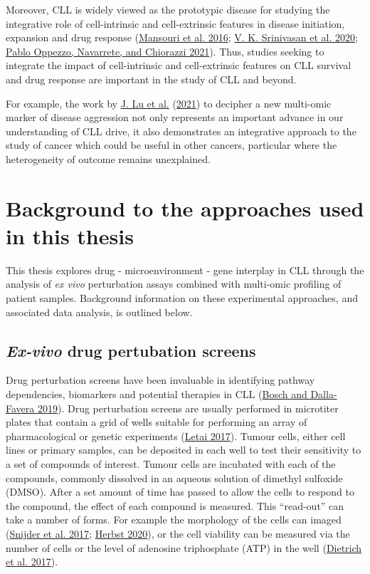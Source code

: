 \documentclass[11pt, a4paper, twosided]{book}
\begin{document}
Moreover, CLL is widely viewed as the prototypic disease for studying the integrative role of cell-intrinsic and cell-extrinsic features in disease initiation, expansion and drug response (\protect\hyperlink{ref-Mansouri2016}{Mansouri et al. 2016}; \protect\hyperlink{ref-Srinivasan2020}{V. K. Srinivasan et al. 2020}; \protect\hyperlink{ref-Oppezzo2021}{Pablo Oppezzo, Navarrete, and Chiorazzi 2021}). Thus, studies seeking to integrate the impact of cell-intrinsic and cell-extrinsic features on CLL survival and drug response are important in the study of CLL and beyond.

For example, the work by \protect\hyperlink{ref-Lu2021}{J. Lu et al.} (\protect\hyperlink{ref-Lu2021}{2021}) to decipher a new multi-omic marker of disease aggression not only represents an important advance in our understanding of CLL drive, it also demonstrates an integrative approach to the study of cancer which could be useful in other cancers, particular where the heterogeneity of outcome remains unexplained.

\hypertarget{background-approaches-intro}{%
\section{Background to the approaches used in this thesis}\label{background-approaches-intro}}

This thesis explores drug - microenvironment - gene interplay in CLL through the analysis of \emph{ex vivo} perturbation assays combined with multi-omic profiling of patient samples. Background information on these experimental approaches, and associated data analysis, is outlined below.

\hypertarget{drug-perturbation-screens-intro}{%
\subsection{\texorpdfstring{\emph{Ex-vivo} drug pertubation screens}{Ex-vivo drug pertubation screens}}\label{drug-perturbation-screens-intro}}

Drug perturbation screens have been invaluable in identifying pathway dependencies, biomarkers and potential therapies in CLL (\protect\hyperlink{ref-Bosch2019}{Bosch and Dalla-Favera 2019}). Drug perturbation screens are usually performed in microtiter plates that contain a grid of wells suitable for performing an array of pharmacological or genetic experiments (\protect\hyperlink{ref-Letai2017}{Letai 2017}). Tumour cells, either cell lines or primary samples, can be deposited in each well to test their sensitivity to a set of compounds of interest. Tumour cells are incubated with each of the compounds, commonly dissolved in an aqueous solution of dimethyl sulfoxide (DMSO). After a set amount of time has passed to allow the cells to respond to the compound, the effect of each compound is measured. This ``read-out'' can take a number of forms. For example the morphology of the cells can imaged (\protect\hyperlink{ref-Snijder2017}{Snijder et al. 2017}; \protect\hyperlink{ref-HerbstThesis}{Herbst 2020}), or the cell viability can be measured via the number of cells or the level of adenosine triphosphate (ATP) in the well (\protect\hyperlink{ref-JCIpaper}{Dietrich et al. 2017}).
\end{document}
